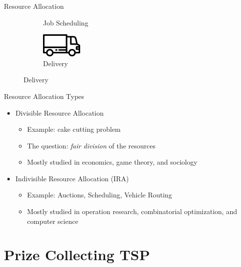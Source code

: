 \begin{frame}[t]{Resource Allocation}
\begin{itemize}
\begin{figure}
\begin{subfigure}[b]{0.45\textwidth}
                \caption*{Job Scheduling}
                \label{fig:my_label}
            \end{subfigure}
            \begin{subfigure}[b]{0.45\textwidth}      
                \centering
                \includegraphics[width=2cm]{delivery-truck.eps}
                \caption*{Delivery}
                \label{fig:my_label}
            \end{subfigure}
        \end{figure}
    \end{itemize}    
\end{frame}

\begin{frame}[t]{Resource Allocation Types}
    \begin{itemize}
        \item<2-> Divisible Resource Allocation
            \begin{itemize}
                \item<3-> Example: cake cutting problem
            	\item<4-> The question: \emph{fair division} of the resources
            	\item<5-> Mostly studied in  economics, game theory, and sociology
            \end{itemize}
        \item<6-> Indivisible Resource Allocation (\alert{IRA})
            \begin{itemize}
                \item<7-> Example: Auctions, Scheduling, Vehicle Routing
                \item<8-> Mostly studied in operation research, combinatorial optimization, and computer science
            \end{itemize}  
    \end{itemize}
\end{frame}

\section{Prize Collecting TSP}
\frame{\textbf{\insertsection}}

